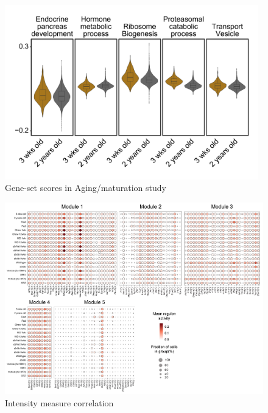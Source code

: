 
\begin{figure}[t]
\centering
\includegraphics[width=11cm]{Appendix2/Fig/F3-14-01.png}
\caption[]{Gene-set scores in Aging/maturation study}
\label{suppl_fig:chp3_agingscores}
\end{figure}




\begin{figure}[H]
\centering
\includegraphics[width=\linewidth]{Appendix2/Fig/F3-15-01.png}
\caption{Intensity measure correlation}
\label{fig:IMs matrix correlation}
\end{figure}
